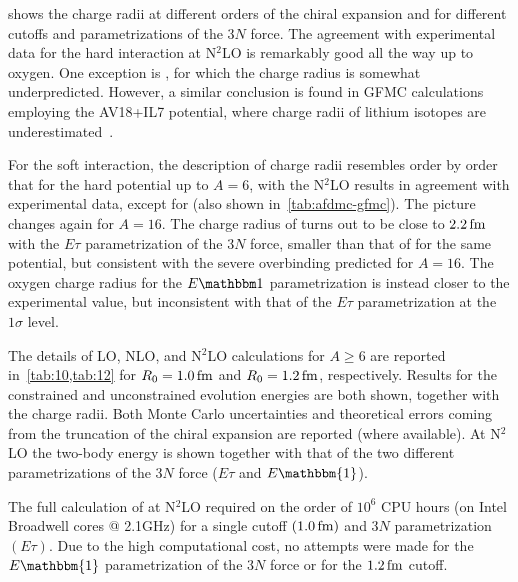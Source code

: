 \documentclass[aps,prc,twocolumn,superscriptaddress,floatfix]{revtex4-1}
\begin{document}
 shows the charge radii at different orders of the chiral 
expansion and for different cutoffs and parametrizations of the $3N$ force. 
The agreement with experimental data for the hard interaction at N$^2$LO is remarkably
good all the way up to oxygen. One exception is , for which the charge radius
is somewhat underpredicted. However, a similar conclusion is found in GFMC calculations
employing the AV18+IL7 potential, where charge radii of lithium isotopes are 
underestimated~\cite{Carlson:2015}. 

For the soft interaction, the description of charge radii resembles order by order 
that for the hard potential up to $A=6$, with the N$^2$LO results in agreement 
with experimental data, except for  (also shown in~\cref{tab:afdmc-gfmc}). 
The picture changes again for $A=16$. The charge radius of  turns out to 
be close to $2.2\,\rm fm$ with the $E\tau$ parametrization of the $3N$ force, 
smaller than that of  for the same potential, but consistent with the 
severe overbinding predicted for $A=16$. The oxygen charge radius for the $E\mathbbm1$ 
parametrization is instead closer to the experimental value, but inconsistent with 
that of the $E\tau$ parametrization at the $1\sigma$ level.

The details of LO, NLO, and N$^2$LO calculations for $A\ge6$ are reported in~\cref{tab:10,tab:12}
for $R_0=1.0\,\rm fm$ and $R_0=1.2\,\rm fm$, respectively. Results for the constrained and 
unconstrained evolution energies are both shown, together with the charge radii.
Both Monte Carlo uncertainties and theoretical errors coming from the truncation of the chiral 
expansion are reported (where available). At N$^2$LO the two-body energy is shown together with
that of the two different parametrizations of the $3N$ force ($E\tau$ and $E\mathbbm{1}$).

The full calculation of  at N$^2$LO required on the
order of $10^6$ CPU hours (on Intel Broadwell cores @ 2.1GHz) for a single cutoff $(1.0\,\rm fm)$ 
and $3N$ parametrization $(E\tau)$. Due to the high computational cost, no attempts were
made for the $E\mathbbm{1}$ parametrization of the $3N$ force or for the $1.2\,\rm fm$ cutoff.
\end{document}
